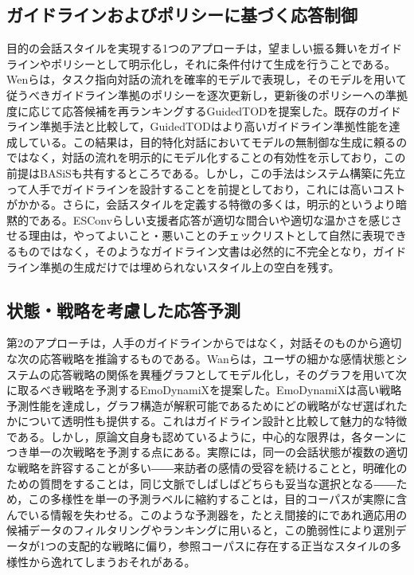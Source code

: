 \documentclass[manuscript,review,anonymous]{acmart}
\begin{document}
\subsection{ガイドラインおよびポリシーに基づく応答制御}
目的の会話スタイルを実現する1つのアプローチは，望ましい振る舞いをガイドラインやポリシーとして明示化し，それに条件付けて生成を行うことである。Wenらは，タスク指向対話の流れを確率的モデルで表現し，そのモデルを用いて従うべきガイドライン準拠のポリシーを逐次更新し，更新後のポリシーへの準拠度に応じて応答候補を再ランキングするGuidedTODを提案した\cite{wen2025guidedtod}。既存のガイドライン準拠手法と比較して，GuidedTODはより高いガイドライン準拠性能を達成している。この結果は，目的特化対話においてモデルの無制御な生成に頼るのではなく，対話の流れを明示的にモデル化することの有効性を示しており，この前提はBASiSも共有するところである。しかし，この手法はシステム構築に先立って人手でガイドラインを設計することを前提としており，これには高いコストがかかる。さらに，会話スタイルを定義する特徴の多くは，明示的というより暗黙的である。ESConvらしい支援者応答が適切な間合いや適切な温かさを感じさせる理由は，やってよいこと・悪いことのチェックリストとして自然に表現できるものではなく，そのようなガイドライン文書は必然的に不完全となり，ガイドライン準拠の生成だけでは埋められないスタイル上の空白を残す。

\subsection{状態・戦略を考慮した応答予測}
第2のアプローチは，人手のガイドラインからではなく，対話そのものから適切な次の応答戦略を推論するものである。Wanらは，ユーザの細かな感情状態とシステムの応答戦略の関係を異種グラフとしてモデル化し，そのグラフを用いて次に取るべき戦略を予測するEmoDynamiXを提案した\cite{wan2025emodynamix}。EmoDynamiXは高い戦略予測性能を達成し，グラフ構造が解釈可能であるためにどの戦略がなぜ選ばれたかについて透明性も提供する。これはガイドライン設計と比較して魅力的な特徴である。しかし，原論文自身も認めているように，中心的な限界は，各ターンにつき単一の次戦略を予測する点にある。実際には，同一の会話状態が複数の適切な戦略を許容することが多い――来訪者の感情の受容を続けることと，明確化のための質問をすることは，同じ文脈でしばしばどちらも妥当な選択となる――ため，この多様性を単一の予測ラベルに縮約することは，目的コーパスが実際に含んでいる情報を失わせる。このような予測器を，たとえ間接的にであれ適応用の候補データのフィルタリングやランキングに用いると，この脆弱性により選別データが1つの支配的な戦略に偏り，参照コーパスに存在する正当なスタイルの多様性から逸れてしまうおそれがある。
\end{document}
